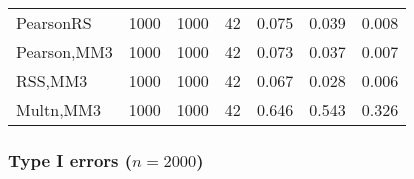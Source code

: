 \documentclass[
]{article}
\begin{document}
\begin{table}[H]
{\begin{tabular}[t]{lrrrrrr}
\hspace{1em}PearsonRS & 1000 & 1000 & 42 & 0.075 & 0.039 & 0.008\\
\hspace{1em}Pearson,MM3 & 1000 & 1000 & 42 & 0.073 & 0.037 & 0.007\\
\hspace{1em}RSS,MM3 & 1000 & 1000 & 42 & 0.067 & 0.028 & 0.006\\
\hspace{1em}Multn,MM3 & 1000 & 1000 & 42 & 0.646 & 0.543 & 0.326\\
\bottomrule
\end{tabular}}
\end{table}

\hypertarget{type-i-errors-n2000-1}{%
\subsubsection{\texorpdfstring{Type I errors
(\(n=2000\))}{Type I errors (n=2000)}}\label{type-i-errors-n2000-1}}
\end{document}

